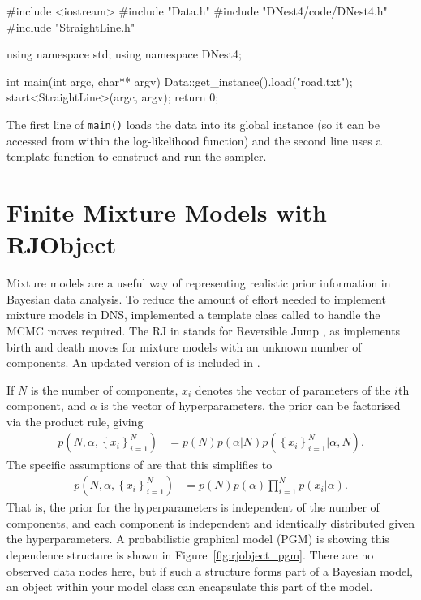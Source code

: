 \documentclass[article]{jss}
\begin{document}
\begin{CodeChunk}
\begin{CodeInput}
#include <iostream>
#include "Data.h"
#include "DNest4/code/DNest4.h"
#include "StraightLine.h"

using namespace std;
using namespace DNest4;

int main(int argc, char** argv)
{
    Data::get_instance().load("road.txt");
    start<StraightLine>(argc, argv);
    return 0;
}
\end{CodeInput}
\end{CodeChunk}


The first line of {\tt main()} loads the data into its global instance
(so it can be accessed from within the log-likelihood function)
and the second line uses a  template function to construct
and run the sampler.

\section{Finite Mixture Models with RJObject}
Mixture models are a useful way of representing realistic prior information
in Bayesian data analysis. To reduce the amount of effort needed to
implement mixture models in DNS, \citet{rjobject} implemented
a template class called  to handle the MCMC moves
required. The RJ in  stands for Reversible Jump \citep{green}, as
 implements birth and death moves for mixture
models with an unknown number of components. An updated version of
 is included in .

If $N$ is the number of components, $x_i$ denotes the vector of parameters
of the $i$th component, and $\alpha$ is the vector of hyperparameters, the prior
can be factorised via the product rule, giving
\begin{align}
p\left(N, \alpha, \left\{x_i\right\}_{i=1}^N\right)
&= p(N)p(\alpha | N)p\left(\left\{x_i\right\}_{i=1}^N | \alpha, N\right).
\end{align}
The specific assumptions of  are that this simplifies to
\begin{align}
p\left(N, \alpha, \left\{x_i\right\}_{i=1}^N\right)
&= p(N)p(\alpha)
\prod_{i=1}^N
p\left(x_i | \alpha\right).\label{eqn:rjobject}
\end{align}
That is, the prior for the hyperparameters is independent of the number of
components, and each component is independent and identically
distributed given the hyperparameters.
A probabilistic graphical model (PGM) is showing this dependence
structure is shown in Figure~\ref{fig:rjobject_pgm}. There are no observed
data nodes here, but if such a structure forms part of a
Bayesian model, an  object within your model class
can encapsulate this part of the model.
\end{document}
